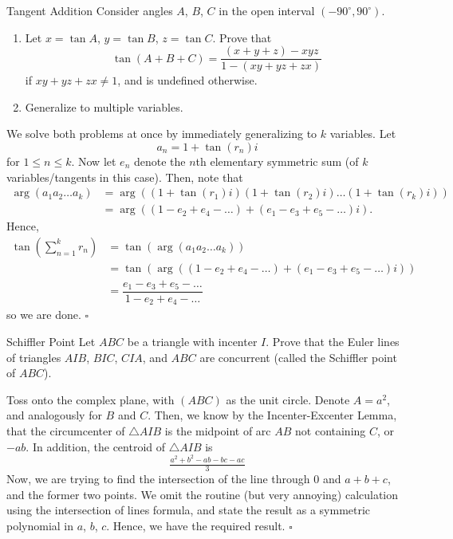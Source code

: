 \documentclass{article}
\begin{document}
\begin{problem}[6.39]{Tangent Addition}
Consider angles $A$, $B$, $C$ in the open interval $(-90^\circ, 90^\circ)$.
\begin{enumerate}[label=(\alph*)]
\item Let $x = \tan A$, $y = \tan B$, $z = \tan C$. Prove that \[\tan(A + B + C) = \dfrac{(x + y + z) - xyz}{1 - (xy + yz + zx)}\] if $xy + yz + zx \neq 1$, and is undefined otherwise.
\item Generalize to multiple variables.
\end{enumerate}
\end{problem}
We solve both problems at once by immediately generalizing to $k$ variables. Let \[a_n = 1+\tan(r_n)i\] for $1 \le n \le k$. Now let $e_n$ denote the $n$th elementary symmetric sum (of $k$ variables/tangents in this case). Then, note that 
\begin{align*}
\arg(a_1a_2\dots a_k) &= \arg((1+\tan(r_1)i)(1+\tan(r_2)i)\dots(1+\tan(r_k)i)) \\
&= \arg((1-e_2+e_4-\dots)+(e_1-e_3+e_5-\dots)i).
\end{align*}
Hence, 
\begin{align*}
\tan\left(\textstyle\sum_{n=1}^k r_n\right) &= \tan\left(\arg(a_1a_2\dots a_k)\right) \\
&= \tan(\arg((1-e_2+e_4-\dots)+(e_1-e_3+e_5-\dots)i)) \\
&= \dfrac{e_1-e_3+e_5-\dots}{1-e_2+e_4-\dots}
\end{align*}
so we are done. $\square$

\begin{problem}[6.40]{Schiffler Point}
Let $ABC$ be a triangle with incenter $I$. Prove that the Euler lines of triangles $AIB$, $BIC$, $CIA$, and $ABC$ are concurrent (called the Schiffler point of $ABC$).
\end{problem}
Toss onto the complex plane, with $(ABC)$ as the unit circle. Denote $A = a^2$, and analogously for $B$ and $C$. Then, we know by the Incenter-Excenter Lemma, that the circumcenter of $\triangle AIB$ is the midpoint of arc $AB$ not containing $C$, or $-ab$. In addition, the centroid of $\triangle AIB$ is \[\tfrac{a^2+b^2-ab-bc-ac}{3}\] Now, we are trying to find the intersection of the line through $0$ and $a+b+c$, and the former two points. We omit the routine (but very annoying) calculation using the intersection of lines formula, and state the result as a symmetric polynomial in $a$, $b$, $c$. Hence, we have the required result. $\square$
\end{document}

